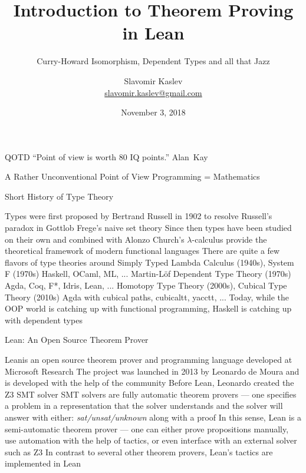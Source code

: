 \documentclass[pdf]{beamer}
\title{Introduction to Theorem Proving in Lean}
\subtitle{Curry-Howard Isomorphism, Dependent Types and all that Jazz}
\author{Slavomir Kaslev \\
  \href{mailto:slavomir.kaslev@gmail.com}{slavomir.kaslev@gmail.com}}
\date{November 3, 2018}
\begin{document}
\begin{frame}
  \titlepage
\end{frame}

\begin{frame}{QOTD}
  ``Point of view is worth 80 IQ points.'' \mbox{Alan Kay}
\end{frame}

\begin{frame}{A Rather Unconventional Point of View}
  \centering \Large
  Programming\footnotemark[1]\hspace*{1pt} = Mathematics
\end{frame}

\begin{frame}{Short History of Type Theory}
  \begin{outline}
    \1 Types were first proposed by Bertrand Russell in 1902 to resolve Russell's paradox in Gottlob Frege's naive set theory
    \1 Since then types have been studied on their own and combined with Alonzo Church's $\lambda$-calculus
    provide the theoretical framework of modern functional languages
    \1 There are quite a few flavors of type theories around
    \2 Simply Typed Lambda Calculus (1940s), System F (1970s)
    \3 Haskell, OCaml, ML, ...
    \2 Martin-Löf Dependent Type Theory (1970s)
    \3 Agda, Coq, F*, Idris, Lean, ...
    \2 Homotopy Type Theory (2000s), Cubical Type Theory (2010s)
    \3 Agda with cubical paths, cubicaltt, yacctt, ...
    \1 Today, while the OOP world is catching up with functional programming, Haskell is catching up with dependent types
  \end{outline}
\end{frame}

\begin{frame}{Lean: An Open Source Theorem Prover}
  \begin{outline}
    \1 Lean\footnotemark[2] is an open source theorem prover and programming language developed at Microsoft Research
    \1 The project was launched in 2013 by Leonardo de Moura and is developed with the help of the community
    \2 Before Lean, Leonardo created the Z3\footnotemark[3]\hspace*{1pt} SMT solver
    \2 SMT solvers are fully automatic theorem provers --- one specifies a problem in a representation that the solver understands and the solver will answer with either: {\em sat/unsat/unknown} along with a proof
    \2 In this sense, Lean is a semi-automatic theorem prover --- one can either prove propositions manually, use automation with the help of tactics, or even interface with an external solver such as Z3
    \2 In contrast to several other theorem provers, Lean's tactics are implemented in Lean
  \end{outline}
\end{frame}
\end{document}
